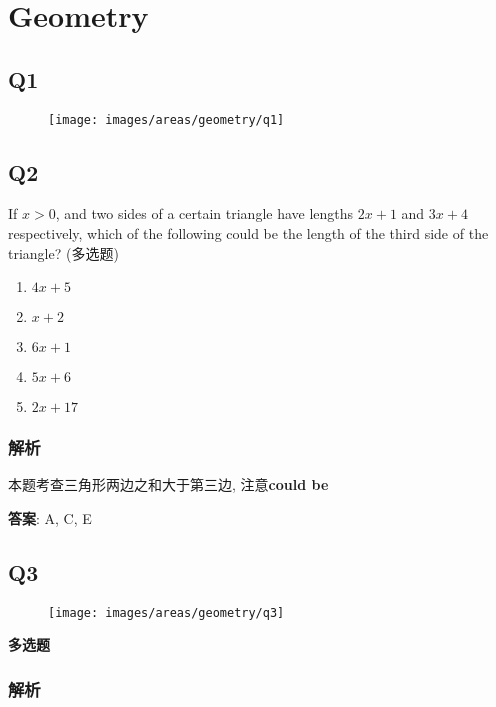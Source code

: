 \chapter{Geometry}

\section{Q1}

  \begin{figure}[H]
    \centering
    \texttt{[image: images/areas/geometry/q1]}
  \end{figure}

\section{Q2}

  If $ x > 0 $, and two sides of a certain triangle have lengths $ 2 x + 1 $
  and $ 3 x + 4 $ respectively, which of the following could be the length of
  the third side of the triangle? (多选题)

  \begin{enumerate}
    \item $ 4x + 5 $
    \item $ x + 2 $
    \item $ 6x + 1 $
    \item $ 5x + 6 $
    \item $ 2x + 17 $
  \end{enumerate}

  \subsection{解析}

    本题考查三角形两边之和大于第三边, 注意\textbf{could be}

    \textbf{答案}: A, C, E

\section{Q3}

  \begin{figure}[H]
    \centering
    \texttt{[image: images/areas/geometry/q3]}
  \end{figure}

  \textbf{多选题}

  \subsection{解析}

